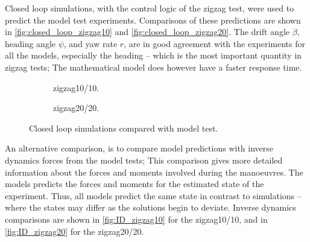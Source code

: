 Closed loop simulations, with the control logic of the zigzag test, were used to predict the model test experiments. Comparisons of these predictions are shown in \autoref{fig:closed_loop_zigzag10} and \autoref{fig:closed_loop_zigzag20}. The drift angle $\beta$, heading angle $\psi$, and yaw rate $r$, are in good agreement with the experiments for all the models, especially the heading -- which is the most important quantity in zigzag tests; The mathematical model does however have a faster response time.

\begin{figure}
     \centering
     \begin{subfigure}[b]{0.49\textwidth}
         \centering
        
        \caption{zigzag10/10.}
    \label{fig:closed_loop_zigzag10}
     \end{subfigure}
     \hfill
     \begin{subfigure}[b]{0.49\textwidth}
            \centering
            
            \caption{zigzag20/20.}
    \label{fig:closed_loop_zigzag20}
     \end{subfigure}
     \caption{Closed loop simulations compared with model test.}
     \label{fig:vct}
\end{figure}
%    
%    
An alternative comparison, is to compare model predictions with inverse dynamics forces from the model tests; This comparison gives more detailed information about the forces and moments involved during the manoeuvres. The models predicts the forces and moments for the estimated state of the experiment. Thus, all models predict the same state in contrast to simulations -- where the states may differ as the solutions begin to deviate. Inverse dynamics comparisons are shown in \autoref{fig:ID_zigzag10} for the zigzag10/10, and in \autoref{fig:ID_zigzag20} for the zigzag20/20.    
